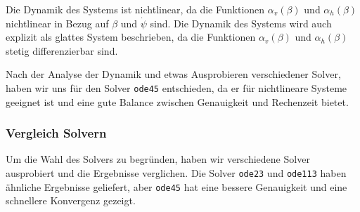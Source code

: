 Die Dynamik des Systems ist nichtlinear, da die Funktionen $\alpha_v(\beta)$ und $\alpha_h(\beta)$ nichtlinear in Bezug auf $\beta$ und $\dot{\psi}$ sind.
Die Dynamik des Systems wird auch explizit als glattes System beschrieben, da die Funktionen $\alpha_v(\beta)$ und $\alpha_h(\beta)$ stetig differenzierbar sind.

Nach der Analyse der Dynamik und etwas Ausprobieren verschiedener Solver, haben wir uns für den Solver \texttt{ode45} entschieden, da er für nichtlineare Systeme geeignet ist und eine gute Balance zwischen Genauigkeit und Rechenzeit bietet.

\subsubsection{Vergleich Solvern}
Um die Wahl des Solvers zu begründen, haben wir verschiedene Solver ausprobiert und die Ergebnisse verglichen.
Die Solver \texttt{ode23} und \texttt{ode113} haben ähnliche Ergebnisse geliefert, aber \texttt{ode45} hat eine bessere Genauigkeit und eine schnellere Konvergenz gezeigt.

